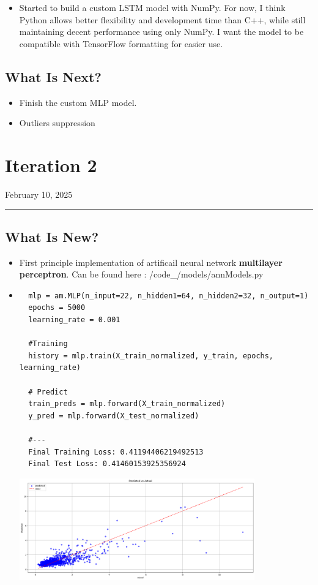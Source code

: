 \documentclass[letterpaper,11pt]{article}
\begin{document}
\begin{itemize}
    \item Started to build a custom LSTM model with NumPy. For now, I think Python allows better flexibility and development time than C++, while still maintaining decent performance using only NumPy. 
    I want the model to be compatible with TensorFlow formatting for easier use.
\end{itemize}

\subsection*{What Is Next?}
\begin{itemize}
    \item Finish the custom MLP model.
    \item Outliers suppression 
\end{itemize}

\newpage
\section*{Iteration 2}
\begin{flushright}
February 10, 2025
\end{flushright}
\hrule
\vspace{0.2in}
\subsection*{What Is New?}
\begin{itemize}
  \item First principle implementation of artificail neural network \textbf{multilayer perceptron}. Can be found here : /code\_/models/annModels.py
  \item \begin{verbatim}
  mlp = am.MLP(n_input=22, n_hidden1=64, n_hidden2=32, n_output=1)
  epochs = 5000
  learning_rate = 0.001
  
  #Training
  history = mlp.train(X_train_normalized, y_train, epochs, learning_rate)
  
  # Predict
  train_preds = mlp.forward(X_train_normalized)
  y_pred = mlp.forward(X_test_normalized)

  #---
  Final Training Loss: 0.41194406219492513
  Final Test Loss: 0.41460153925356924
  \end{verbatim}
  
  \begin{center}
    \includegraphics[width=0.8\textwidth]{img/custom_model_perf.png}
    \end{center}
\end{itemize}
\end{document}
